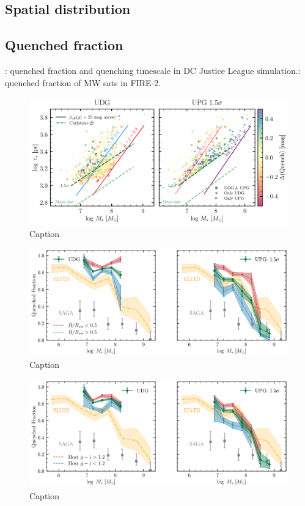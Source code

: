 \documentclass[twocolumn,astrosymb,twocolappendix]{aastex631}
\begin{document}
\begin{CJK*}{UTF8}{gbsn}
\subsection{Spatial distribution}

\subsection{Quenched fraction}\label{sec:quench}

\citep{Baxter2021}

\citep{Akins2021}: quenched fraction and quenching timescale in DC Justice League simulation.\citep{Samuel2022}: quenched fraction of MW sats in FIRE-2.

\begin{figure}
	\vbox{ 
		\centering
		\includegraphics[width=1\linewidth]{mass_size_plane.pdf}
	}
    \caption{Caption}
    \label{fig:mass_size}
\end{figure}

\begin{figure}
	\vbox{ 
		\centering
		\includegraphics[width=1\linewidth]{quenched_frac_dist2host.pdf}
	}
    \caption{Caption}
    \label{fig:qfrac_dist2host}
\end{figure}

\begin{figure}
	\vbox{ 
		\centering
		\includegraphics[width=1\linewidth]{quenched_frac_host_color.pdf}
	}
    \caption{Caption}
    \label{fig:qfrac_host_color}
\end{figure}


\end{CJK*}
\end{document}
